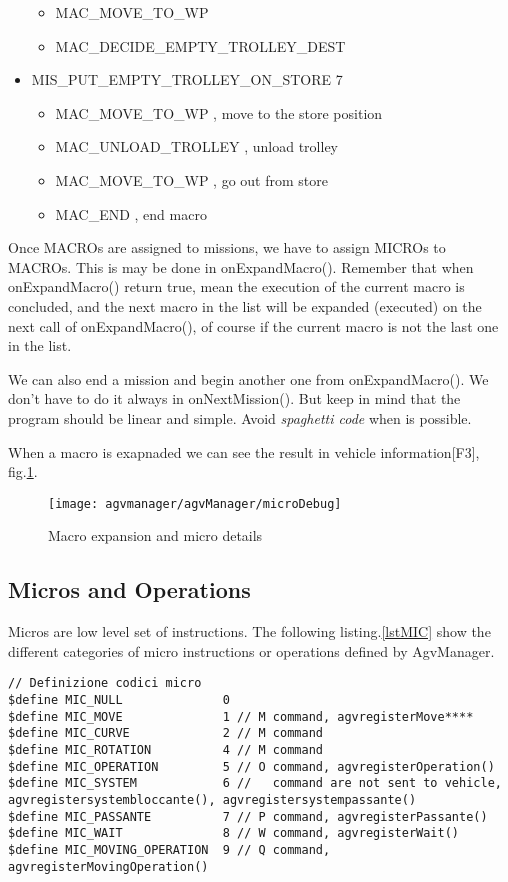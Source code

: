 \begin{itemize}
\begin{itemize}
		\item MAC\_MOVE\_TO\_WP
		\item MAC\_DECIDE\_EMPTY\_TROLLEY\_DEST
	\end{itemize}
\item MIS\_PUT\_EMPTY\_TROLLEY\_ON\_STORE 7
	\begin{itemize}
		\item MAC\_MOVE\_TO\_WP , move to the store position
		\item MAC\_UNLOAD\_TROLLEY , unload trolley
		\item MAC\_MOVE\_TO\_WP , go out from store
		\item MAC\_END , end macro
	\end{itemize}
\end{itemize}

Once MACROs are assigned to missions, we have to assign MICROs to MACROs. This is may be done in onExpandMacro(). Remember that when onExpandMacro() return true, mean the execution of the current macro is concluded, and the next macro in the list will be expanded (executed) on the next call of onExpandMacro(), of course if the current macro is not the last one in the list.

We can also end a mission and begin another one from onExpandMacro(). We don't have to do it always in onNextMission(). But keep in mind that the program should be linear and simple. Avoid \textit{spaghetti code} when is possible.

When a macro is exapnaded we can see the result in vehicle information[F3], fig.\ref{figmacroexp}.

\begin{figure}
	\centering\texttt{[image: agvmanager/agvManager/microDebug]}
	\caption{Macro expansion and micro details}
	\label{figmacroexp}
\end{figure}
%
\subsection{Micros and Operations}
Micros are low level set of instructions. The following listing.\ref{lstMIC} show the different categories of micro instructions or operations defined by AgvManager. 

\begin{lstlisting}[caption= Different catergory of MIC defined in AgvManager, label=lstMIC]
// Definizione codici micro
$define MIC_NULL              0
$define MIC_MOVE              1 // M command, agvregisterMove****
$define MIC_CURVE             2 // M command
$define MIC_ROTATION          4 // M command
$define MIC_OPERATION         5 // O command, agvregisterOperation()
$define MIC_SYSTEM            6 //   command are not sent to vehicle, agvregistersystembloccante(), agvregistersystempassante()
$define MIC_PASSANTE          7 // P command, agvregisterPassante()
$define MIC_WAIT              8 // W command, agvregisterWait()
$define MIC_MOVING_OPERATION  9 // Q command, agvregisterMovingOperation()

\end{lstlisting}

